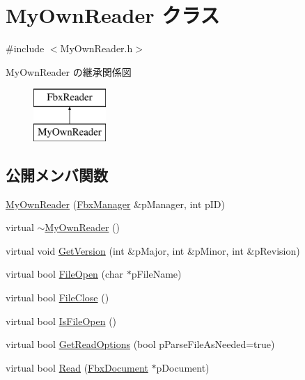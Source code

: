 \hypertarget{class_my_own_reader}{}\section{My\+Own\+Reader クラス}
\label{class_my_own_reader}


{\ttfamily \#include $<$My\+Own\+Reader.\+h$>$}

My\+Own\+Reader の継承関係図\begin{figure}[H]
\begin{center}
\leavevmode
\includegraphics[height=2.000000cm]{class_my_own_reader}
\end{center}
\end{figure}
\subsection*{公開メンバ関数}
\begin{DoxyCompactItemize}
\item 
\hyperlink{class_my_own_reader_ae08ec70c8c7814b36681599259e31904}{My\+Own\+Reader} (\hyperlink{class_fbx_manager}{Fbx\+Manager} \&p\+Manager, int p\+ID)
\item 
virtual \hyperlink{class_my_own_reader_abd01d1e784497c26760db38ae18ee709}{$\sim$\+My\+Own\+Reader} ()
\item 
virtual void \hyperlink{class_my_own_reader_aa57a92ed234912fb6d570a03fe265124}{Get\+Version} (int \&p\+Major, int \&p\+Minor, int \&p\+Revision)
\item 
virtual bool \hyperlink{class_my_own_reader_a77f7f753ea30442895994a0f6c0479d8}{File\+Open} (char $\ast$p\+File\+Name)
\item 
virtual bool \hyperlink{class_my_own_reader_abc7f3b49b51e2e59e502e774c78443d8}{File\+Close} ()
\item 
virtual bool \hyperlink{class_my_own_reader_a31426db70bc2b4e7382563713952111a}{Is\+File\+Open} ()
\item 
virtual bool \hyperlink{class_my_own_reader_a0ce8b8bc4f216b5e87574796aa973219}{Get\+Read\+Options} (bool p\+Parse\+File\+As\+Needed=true)
\item 
virtual bool \hyperlink{class_my_own_reader_a0b742b5ba8aa552aa4968349a0068673}{Read} (\hyperlink{class_fbx_document}{Fbx\+Document} $\ast$p\+Document)
\end{DoxyCompactItemize}
